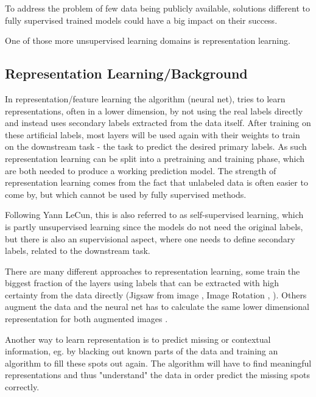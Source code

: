 To address the problem of few data being publicly available, solutions different to fully supervised trained models could have a big impact on their success.

One of those more unsupervised learning domains is representation learning.

\subsection{Representation Learning/Background} \label{representation-learning}

In representation/feature learning the algorithm (neural net), tries to learn representations, often in a lower dimension, by not using the real labels directly and instead uses secondary labels extracted from the data itself. After training on these artificial labels, most layers will be used again with their weights to train on the downstream task - the task to predict the desired primary labels. As such representation learning can be split into a pretraining and training phase, which are both needed to produce a working prediction model. The strength of representation learning comes from the fact that unlabeled data is often easier to come by, but which cannot be used by fully supervised methods.

Following Yann LeCun, this is also referred to as self-supervised learning\autocite{YANNLECUNFacebookUnsupervised}, which is partly unsupervised learning since the models do not need the original labels, but there is also an supervisional aspect, where one needs to define secondary labels, related to the downstream task. 

There are many different approaches to representation learning, some train the biggest fraction of the layers using labels that can be extracted with high certainty from the data directly (Jigsaw from image \autocite{noroozi2017unsupervised}, Image Rotation \autocite{gidaris2018unsupervised}, \autocite{doersch2016unsupervised}). Others augment the data and the neural net has to calculate the same lower dimensional representation for both augmented images \autocite{chen2020simple}. 

Another way to learn representation is to predict missing or contextual information, eg. by blacking out known parts of the data and training an algorithm to fill these spots out again. The algorithm will have to find meaningful representations and thus "understand" the data in order predict the missing spots correctly. 

